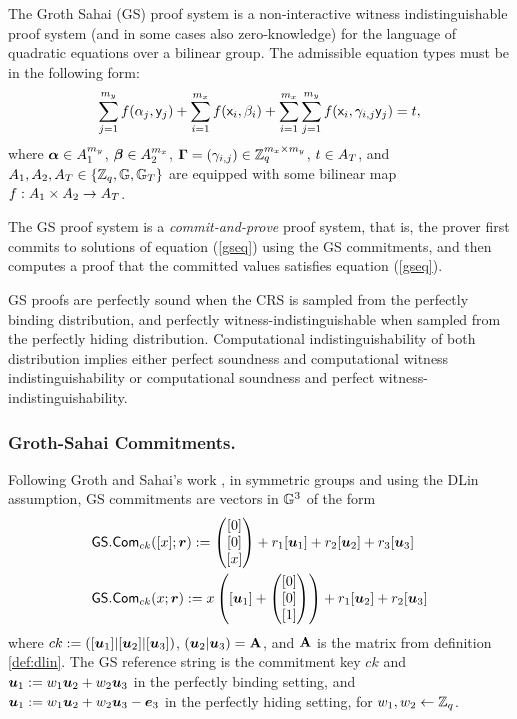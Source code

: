 The Groth Sahai (GS) proof system is a non-interactive witness indistinguishable proof system (and in some cases also zero-knowledge) for the language of quadratic equations over a bilinear group. The admissible equation types must be in the following form:
\begin{equation}\label{gseq}
\sum_{j=1}^{m_y} f(\alpha_j, \mathsf{y}_j)+\sum_{i=1}^{m_x} f(\mathsf{x}_i, \beta_i)+\sum_{i=1}^{m_x} \sum_{j=1}^{m_y}  f(\mathsf{x}_i,\gamma_{i,j} \mathsf{y}_j)=t,
\end{equation}
 where $\boldsymbol \alpha  \in A_1^{m_y}$, $\boldsymbol \beta  \in A_2^{m_x}$, $\mathbf{{\Gamma}}=(\gamma_{i,j}) \in \mathbb{Z}_q^{m_x\times m_y}$, $t \in A_T$, and $A_1,A_2,A_T\in\{\mathbb{Z}_q,\mathbb{G},\mathbb{G}_T\}$ 
are equipped with some bilinear map $f:A_1\times A_2 \rightarrow A_T$.

The GS proof system is a \emph{commit-and-prove} proof system, that is, the prover first commits to solutions
of equation (\ref{gseq}) using the GS commitments, and then computes a proof that the committed values satisfies equation (\ref{gseq}).

GS proofs are perfectly sound when the CRS is sampled from the perfectly binding distribution, and perfectly witness-indistinguishable when sampled from the perfectly hiding distribution. Computational indistinguishability of  both distribution implies either perfect soundness and computational witness indistinguishability or computational soundness and perfect witness-indistinguishability.

\subsubsection{Groth-Sahai Commitments.}
Following Groth and Sahai's work \cite{EC:GroSah08}, in symmetric groups and using the  DLin assumption, GS commitments are vectors in $\mathbb{G}^3$ of the form
\begin{align*}
&{\mathsf{GS}}.\mathsf{Com}_{ck}([x];{\boldsymbol{r}}):=\left(\begin{matrix}{[0]}\\{[0]}\\{[x]}\end{matrix}\right)+r_1[{\boldsymbol{u}}_1]+{r}_2[{\boldsymbol{u}}_2]+r_3[{\boldsymbol{u}}_3]\\
&{\mathsf{GS}}.\mathsf{Com}_{ck}(x;{\boldsymbol{r}}):=x\left([{\boldsymbol{u}}_1]+\left(\begin{matrix}{[0]}\\{[0]}\\{[1]}\end{matrix}\right)\right)+{r}_1[{\boldsymbol{u}}_2]+r_2[{\boldsymbol{u}}_3]
\end{align*}
where $ck:=([{\boldsymbol{u}}_1]|[{\boldsymbol{u}}_2]|[{\boldsymbol{u}}_3])$, $({\boldsymbol{u}}_2|{\boldsymbol{u}}_3)=\mathbf{{A}}$, and $\mathbf{{A}}$ is the matrix from definition \ref{def:dlin}. The GS reference string is the commitment key $ck$  and ${\boldsymbol{u}}_1:=w_1{\boldsymbol{u}}_2+w_2{\boldsymbol{u}}_3$ in the perfectly binding setting, and ${\boldsymbol{u}}_1:=w_1{\boldsymbol{u}}_2+w_2{\boldsymbol{u}}_3-{\boldsymbol{e}}_3$ in the perfectly hiding setting, for $w_1,w_2\gets\mathbb{Z}_q$.
